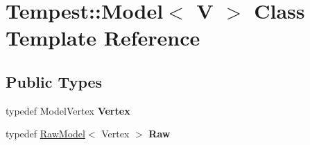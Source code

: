 \hypertarget{class_tempest_1_1_model}{\section{Tempest\+:\+:Model$<$ V $>$ Class Template Reference}
\label{class_tempest_1_1_model}
}
\subsection*{Public Types}
\begin{DoxyCompactItemize}
\item 
\hypertarget{class_tempest_1_1_model_a62e8ff84f406936f893cf21f015bc1cc}{typedef Model\+Vertex {\bfseries Vertex}}\label{class_tempest_1_1_model_a62e8ff84f406936f893cf21f015bc1cc}

\item 
\hypertarget{class_tempest_1_1_model_a07e3ed85ca32136b470a1409f937798a}{typedef \hyperlink{struct_tempest_1_1_raw_model}{Raw\+Model}$<$ Vertex $>$ {\bfseries Raw}}\label{class_tempest_1_1_model_a07e3ed85ca32136b470a1409f937798a}

\end{DoxyCompactItemize}
